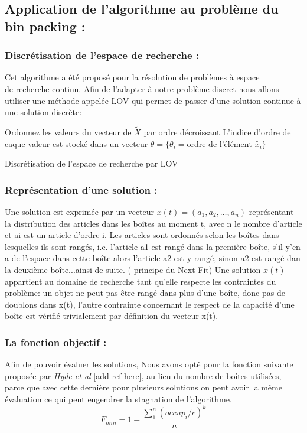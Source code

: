 \documentclass[class=article, crop=false]{standalone}
\begin{document}
\subsection{Application de l’algorithme au problème du bin packing :}
\subsubsection{Discrétisation de l'espace de recherche :}
Cet algorithme a été proposé pour la résolution de problèmes à espace \\ de recherche continu. Afin de l’adapter à notre problème discret nous allons utiliser une méthode appelée LOV qui permet de passer d’une solution continue à une solution discrète:\\
\begin{algorithm}[H]
    \SetAlgoLined
    Ordonnez les valeurs du vecteur de \(\tilde{X}\) par ordre décroissant\;
    L'indice d'ordre de caque valeur est stocké dans un vecteur \(\theta = \{ \theta_i = \text{ordre de l'élément } \tilde{x_i}\}\)\;
     \caption{Discrétisation de l'espace de recherche par LOV}
    \end{algorithm}
\subsubsection{Représentation d’une solution :}
Une solution est exprimée par un vecteur \(x(t)=(a_1, a_2, …, a_n)\) représentant la distribution des articles dans les boîtes au moment t, avec n le nombre d’article et ai est un article d’ordre i. Les articles sont ordonnés selon les boîtes dans lesquelles ils sont rangés, i.e. l’article a1 est rangé dans la première boîte, s’il y’en a de l’espace dans cette boîte alors l’article a2 est y rangé, sinon a2 est rangé dan la deuxième boîte...ainsi de suite. ( principe du Next Fit) 
Une solution \(x(t)\) appartient au domaine de recherche tant qu’elle respecte les contraintes du problème: un objet ne peut pas être rangé dans plus d’une boîte, donc pas de doublons dans x(t), l’autre contrainte concernant le respect de la capacité d’une boîte est vérifié trivialement par définition du vecteur x(t).

\subsubsection{La fonction objectif :}
Afin de pouvoir évaluer les solutions, Nous avons opté pour la fonction suivante proposée par \emph{Hyde et al} [add ref here], au lieu du nombre de boîtes utilisées, parce que avec cette dernière pour plusieurs solutions on peut avoir la même évaluation ce qui peut engendrer la stagnation de l’algorithme.
\[ F_{min} = 1 - \frac{\sum_{1}^{n} (occup_i / c)^k}{n}\]
\end{document}
